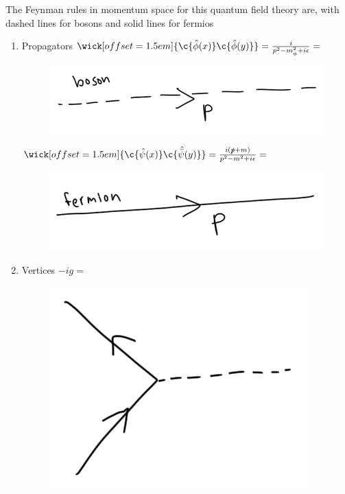 \noindent The Feynman rules in momentum space for this quantum field theory are, with dashed lines for bosons and solid lines for fermios

\begin{enumerate}
\item Propagators
	\subitem $\wick[offset=1.5em]{\c {\hat{\phi}(x)} \c {\hat{\phi}(y)}} = \frac{i}{p^2 - m_\phi^2 + i \epsilon} = $ \begin{figure}[H]\centering \includegraphics[scale=0.3]{bosonprop.png}  \end{figure}
	\subitem $\wick[offset=1.5em]{\c {\hat{\psi}(x)} \c {\hat{\bar{\psi}}(y)}} = \frac{i (\slashed{p} + m)}{p^2 - m^2 + i \epsilon} = $ \begin{figure}[H]\centering \includegraphics[scale=0.3]{fermionprop.png}  \end{figure}
\item Vertices
	\subitem $-ig = $ \begin{figure}[H]\centering \includegraphics[scale=0.3]{vertex.png}  \end{figure}

\end{enumerate}
